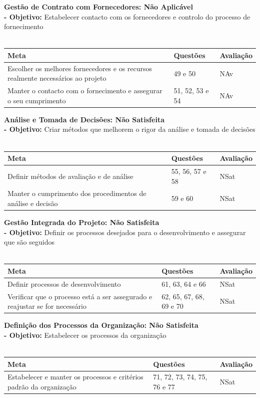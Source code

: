 \documentclass[openany,10pt,a4paper]{article}
\begin{document}
\textbf{Gestão de Contrato com Fornecedores: Não Aplicável} \\ 
\textbf{- Objetivo:} Estabelecer contacto com os fornecedores e controlo do processo de fornecimento \\
\\
\begin{tabular}{|p{3.7in}|p{1in}|p{1in}|}	\hline
\textbf{Meta} & \textbf{Questões} & \textbf{Avaliação} \\ \hline
Escolher os melhores fornecedores e os recursos realmente necessários ao projeto & 49 e 50 & NAv \\ 
Manter o contacto com o fornecimento e assegurar o seu cumprimento & 51, 52, 53 e 54 & NAv \\ \hline
\end{tabular}

\textbf{Análise e Tomada de Decisões: Não Satisfeita} \\  
\textbf{- Objetivo:} Criar métodos que melhorem o rigor da análise e tomada de decisões \\
\\
\begin{tabular}{|p{3.7in}|p{1in}|p{1in}|} \hline	
\textbf{Meta} & \textbf{Questões} & \textbf{Avaliação} \\ \hline
Definir métodos de avaliação e de análise & 55, 56, 57 e 58 & NSat \\ 
Manter o cumprimento dos procedimentos de análise e decisão & 59 e 60 & NSat \\ \hline
\end{tabular}

\textbf{Gestão Integrada do Projeto: Não Satisfeita} \\ 
\textbf{- Objetivo:} Definir os processos desejados para o desenvolvimento e assegurar que são seguidos \\
\\
\begin{tabular}{|p{3.7in}|p{1in}|p{1in}|}	\hline
\textbf{Meta} & \textbf{Questões} & \textbf{Avaliação} \\ \hline
Definir processos de desenvolvimento & 61, 63, 64 e 66 & NSat \\
Verificar que o processo está a ser assegurado e reajustar se for necessário & 62, 65, 67, 68, 69 e 70 & NSat \\ \hline
\end{tabular}

\textbf{Definição dos Processos da Organização: Não Satisfeita} \\
\textbf{- Objetivo:} Estabelecer os processos da organização \\
\\
\begin{tabular}{|p{3.7in}|p{1in}|p{1in}|}	\hline	
\textbf{Meta} & \textbf{Questões} & \textbf{Avaliação} \\ \hline
Estabelecer e manter os processos e critérios padrão da organização & 71, 72, 73, 74, 75, 76 e 77 & NSat \\ \hline
\end{tabular}
\end{document}
